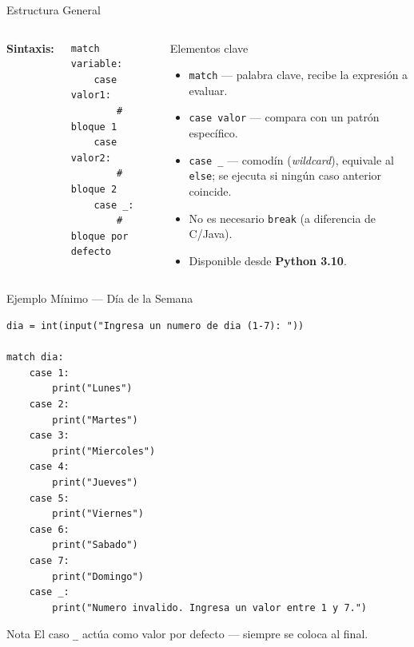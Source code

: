 \documentclass[aspectratio=169,xcolor=dvipsnames]{beamer}
\begin{document}
\begin{frame}[fragile]{Estructura General}
    \begin{columns}
        \textbf{Sintaxis:}
        \begin{lstlisting}[style=PythonStyle]
match variable:
    case valor1:
        # bloque 1
    case valor2:
        # bloque 2
    case _:
        # bloque por defecto
        \end{lstlisting}

        \begin{block}{Elementos clave}
            \begin{itemize}
                \item \texttt{match} — palabra clave, recibe la expresión a evaluar.
                \item \texttt{case valor} — compara con un patrón específico.
                \item \texttt{case \_} — comodín (\textit{wildcard}), equivale al \texttt{else}; se ejecuta si ningún caso anterior coincide.
                \item No es necesario \texttt{break} (a diferencia de C/Java).
                \item Disponible desde \textbf{Python 3.10}.
            \end{itemize}
        \end{block}
    \end{columns}
\end{frame}

\begin{frame}[fragile]{Ejemplo Mínimo — Día de la Semana}
\begin{lstlisting}[style=PythonStyle]
dia = int(input("Ingresa un numero de dia (1-7): "))

match dia:
    case 1:
        print("Lunes")
    case 2:
        print("Martes")
    case 3:
        print("Miercoles")
    case 4:
        print("Jueves")
    case 5:
        print("Viernes")
    case 6:
        print("Sabado")
    case 7:
        print("Domingo")
    case _:
        print("Numero invalido. Ingresa un valor entre 1 y 7.")
\end{lstlisting}

    \begin{exampleblock}{Nota}
        El caso \texttt{\_} actúa como valor por defecto — siempre se coloca al final.
    \end{exampleblock}
\end{frame}
\end{document}
